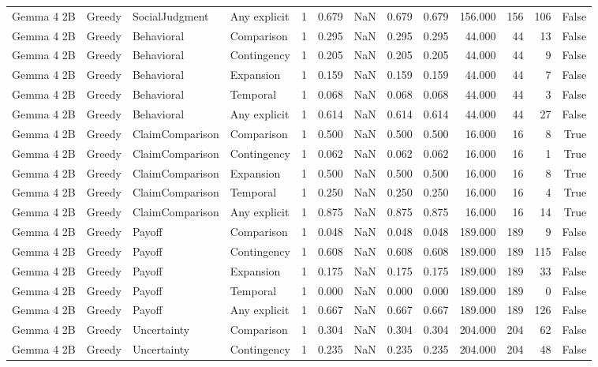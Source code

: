 \begin{tabular}{llllrrrrrrrrr}
Gemma 4 2B & Greedy & SocialJudgment & Any explicit & 1 & 0.679 & NaN & 0.679 & 0.679 & 156.000 & 156 & 106 & False \\
Gemma 4 2B & Greedy & Behavioral & Comparison & 1 & 0.295 & NaN & 0.295 & 0.295 & 44.000 & 44 & 13 & False \\
Gemma 4 2B & Greedy & Behavioral & Contingency & 1 & 0.205 & NaN & 0.205 & 0.205 & 44.000 & 44 & 9 & False \\
Gemma 4 2B & Greedy & Behavioral & Expansion & 1 & 0.159 & NaN & 0.159 & 0.159 & 44.000 & 44 & 7 & False \\
Gemma 4 2B & Greedy & Behavioral & Temporal & 1 & 0.068 & NaN & 0.068 & 0.068 & 44.000 & 44 & 3 & False \\
Gemma 4 2B & Greedy & Behavioral & Any explicit & 1 & 0.614 & NaN & 0.614 & 0.614 & 44.000 & 44 & 27 & False \\
Gemma 4 2B & Greedy & ClaimComparison & Comparison & 1 & 0.500 & NaN & 0.500 & 0.500 & 16.000 & 16 & 8 & True \\
Gemma 4 2B & Greedy & ClaimComparison & Contingency & 1 & 0.062 & NaN & 0.062 & 0.062 & 16.000 & 16 & 1 & True \\
Gemma 4 2B & Greedy & ClaimComparison & Expansion & 1 & 0.500 & NaN & 0.500 & 0.500 & 16.000 & 16 & 8 & True \\
Gemma 4 2B & Greedy & ClaimComparison & Temporal & 1 & 0.250 & NaN & 0.250 & 0.250 & 16.000 & 16 & 4 & True \\
Gemma 4 2B & Greedy & ClaimComparison & Any explicit & 1 & 0.875 & NaN & 0.875 & 0.875 & 16.000 & 16 & 14 & True \\
Gemma 4 2B & Greedy & Payoff & Comparison & 1 & 0.048 & NaN & 0.048 & 0.048 & 189.000 & 189 & 9 & False \\
Gemma 4 2B & Greedy & Payoff & Contingency & 1 & 0.608 & NaN & 0.608 & 0.608 & 189.000 & 189 & 115 & False \\
Gemma 4 2B & Greedy & Payoff & Expansion & 1 & 0.175 & NaN & 0.175 & 0.175 & 189.000 & 189 & 33 & False \\
Gemma 4 2B & Greedy & Payoff & Temporal & 1 & 0.000 & NaN & 0.000 & 0.000 & 189.000 & 189 & 0 & False \\
Gemma 4 2B & Greedy & Payoff & Any explicit & 1 & 0.667 & NaN & 0.667 & 0.667 & 189.000 & 189 & 126 & False \\
Gemma 4 2B & Greedy & Uncertainty & Comparison & 1 & 0.304 & NaN & 0.304 & 0.304 & 204.000 & 204 & 62 & False \\
Gemma 4 2B & Greedy & Uncertainty & Contingency & 1 & 0.235 & NaN & 0.235 & 0.235 & 204.000 & 204 & 48 & False \\

\end{tabular}
